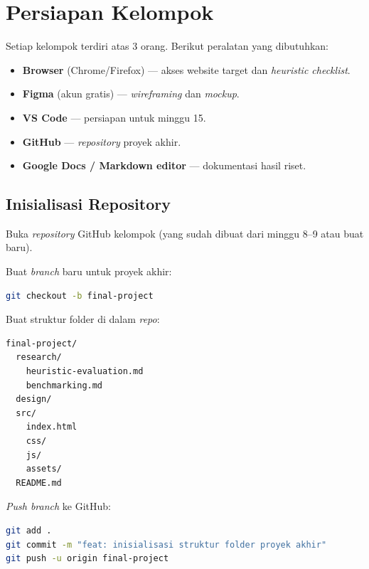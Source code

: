 \section{Persiapan Kelompok}
\label{sec:persiapan-kelompok}

Setiap kelompok terdiri atas 3 orang. Berikut peralatan yang dibutuhkan:

\begin{itemize}
  \item \textbf{Browser} (Chrome/Firefox) --- akses website target dan \emph{heuristic checklist}.
  \item \textbf{Figma} (akun gratis) --- \emph{wireframing} dan \emph{mockup}.
  \item \textbf{VS Code} --- persiapan untuk minggu 15.
  \item \textbf{GitHub} --- \emph{repository} proyek akhir.
  \item \textbf{Google Docs / Markdown editor} --- dokumentasi hasil riset.
\end{itemize}

\subsection{Inisialisasi Repository}
\label{subsec:inisialisasi-repo}

\begin{langkah}
  \item Buka \emph{repository} GitHub kelompok (yang sudah dibuat dari minggu 8--9 atau buat baru).
  \item Buat \emph{branch} baru untuk proyek akhir:
\begin{lstlisting}[language=bash, caption={Membuat branch final-project}]
git checkout -b final-project
\end{lstlisting}
  \item Buat struktur folder di dalam \emph{repo}:
\begin{lstlisting}[caption={Struktur folder proyek akhir}]
final-project/
  research/
    heuristic-evaluation.md
    benchmarking.md
  design/
  src/
    index.html
    css/
    js/
    assets/
  README.md
\end{lstlisting}
  \item \emph{Push branch} ke GitHub:
\begin{lstlisting}[language=bash, caption={Push awal}]
git add .
git commit -m "feat: inisialisasi struktur folder proyek akhir"
git push -u origin final-project
\end{lstlisting}
\end{langkah}

